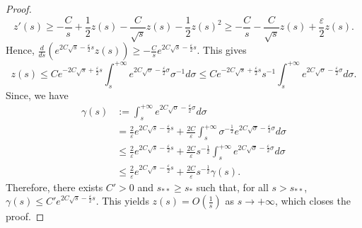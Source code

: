 \documentclass[11pt,a4paper]{article}
\newcommand{\1}{\mathbbm{1}}
\numberwithin{equation}{section}
\theoremstyle{remark}
\begin{document}
\begin{proof}
$$z'(s)\geq -\frac{C}{s}+\frac{1}{2}z(s)-\frac{C}{\sqrt{s}}z(s)-\frac{1}{2}z(s)^2\geq -\frac{C}{s}-\frac{C}{\sqrt{s}}z(s)+\frac{\varepsilon}{2}z(s).$$
Hence, $\frac{d}{ds}(e^{2C\sqrt{s}-\frac{\varepsilon}{2}s}z(s))\geq -\frac{C}{s}e^{2C\sqrt{s}-\frac{\varepsilon}{2}s}$. This gives
$$z(s)\leq Ce^{-2C\sqrt{s}+\frac{\varepsilon}{2}s}\int_s^{+\infty}e^{2C\sqrt{\sigma}-\frac{\varepsilon}{2}\sigma}\sigma^{-1} d\sigma\leq Ce^{-2C\sqrt{s}+\frac{\varepsilon}{2}s}s^{-1}\int_s^{+\infty}e^{2C\sqrt{\sigma}-\frac{\varepsilon}{2}\sigma} d\sigma.$$
Since, we have
\begin{equation}
\begin{split}
\gamma(s)&:=\int_s^{+\infty}e^{2C\sqrt{\sigma}-\frac{\varepsilon}{2}\sigma} d\sigma\\
&=\frac{2}{\varepsilon}e^{2C\sqrt{s}-\frac{\varepsilon}{2}s} +\frac{2C}{\varepsilon}\int_s^{+\infty}\sigma^{-\frac{1}{2}}e^{2C\sqrt{\sigma}-\frac{\varepsilon}{2}\sigma} d\sigma\\
&\leq \frac{2}{\varepsilon}e^{2C\sqrt{s}-\frac{\varepsilon}{2}s} +\frac{2C}{\varepsilon}s^{-\frac{1}{2}}\int_s^{+\infty}e^{2C\sqrt{\sigma}-\frac{\varepsilon}{2}\sigma} d\sigma\\
&\leq \frac{2}{\varepsilon}e^{2C\sqrt{s}-\frac{\varepsilon}{2}s} +\frac{2C}{\varepsilon}s^{-\frac{1}{2}}\gamma(s).
\end{split}
\end{equation}
Therefore, there exists $C'>0$ and $s_{**}\geq s_*$ such that, for all $s>s_{**}$, $\gamma(s) \leq C'e^{2C\sqrt{s}-\frac{\varepsilon}{2}s}$. This yields $z(s)=O(\frac{1}{s})$ as $s\rightarrow +\infty$, which closes the proof.
\end{proof}
\end{document}
